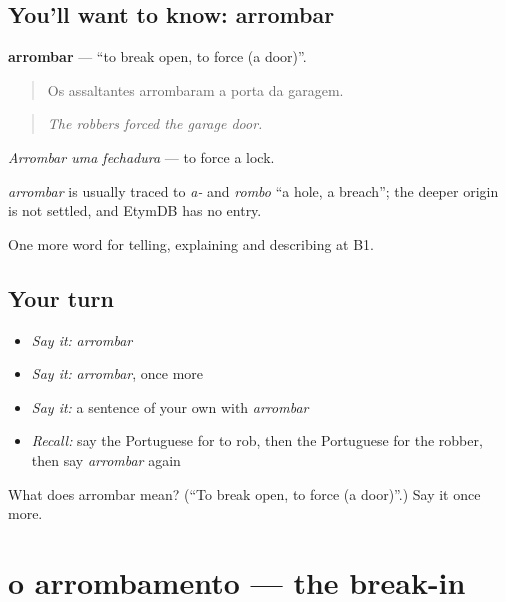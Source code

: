 \subsection*{You'll want to know: arrombar}
\textbf{arrombar} — \textquotedblleft{}to break open, to force (a door)\textquotedblright{}.

\begin{quote}
Os assaltantes arrombaram a porta da garagem.
\end{quote}

\begin{quote}
\emph{The robbers forced the garage door.}
\end{quote}

\emph{Arrombar uma fechadura} — to force a lock.

\begin{cousinweb}
\emph{arrombar} is usually traced to \emph{a-} and \emph{rombo} \textquotedblleft{}a hole, a breach\textquotedblright{}; the deeper origin is not settled, and EtymDB has no entry.
\end{cousinweb}

\begin{grammarlens}[title={What you've built}]
One more word for telling, explaining and describing at B1.
\end{grammarlens}

\subsection*{Your turn}
\begin{itemize}
\raggedright
  \item \emph{Say it:} \emph{arrombar}
  \item \emph{Say it:} \emph{arrombar}, once more
  \item \emph{Say it:} a sentence of your own with \emph{arrombar}
  \item \emph{Recall:} say the Portuguese for to rob, then the Portuguese for the robber, then say \emph{arrombar} again
\end{itemize}

\begin{tcolorbox}[breakable,colback=teal!4,colframe=teal!35!black,title={Before you move on}]
What does arrombar mean? (\textquotedblleft{}To break open, to force (a door)\textquotedblright{}.) Say it once more.
\end{tcolorbox}
\section[o arrombamento]{o arrombamento — the break-in}


